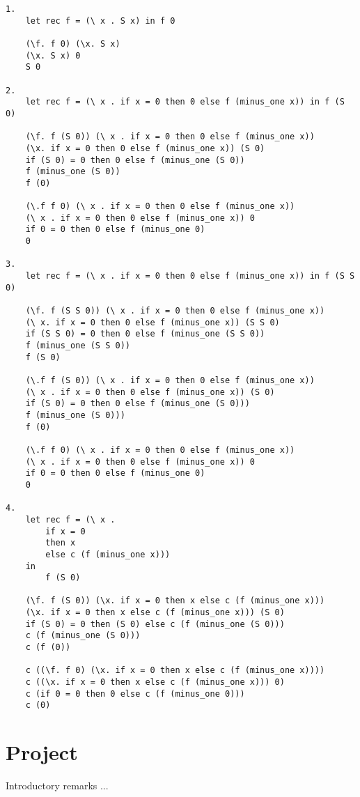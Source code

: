 \documentclass{article}
\theoremstyle{theorem}
\theoremstyle{definition}
\theoremstyle{remark}
\begin{document}
\begin{verbatim}
1.
    let rec f = (\ x . S x) in f 0

    (\f. f 0) (\x. S x)
    (\x. S x) 0
    S 0

2.
    let rec f = (\ x . if x = 0 then 0 else f (minus_one x)) in f (S 0)

    (\f. f (S 0)) (\ x . if x = 0 then 0 else f (minus_one x))
    (\x. if x = 0 then 0 else f (minus_one x)) (S 0)
    if (S 0) = 0 then 0 else f (minus_one (S 0)) 
    f (minus_one (S 0))
    f (0) 

    (\.f f 0) (\ x . if x = 0 then 0 else f (minus_one x))
    (\ x . if x = 0 then 0 else f (minus_one x)) 0
    if 0 = 0 then 0 else f (minus_one 0)
    0

3.
    let rec f = (\ x . if x = 0 then 0 else f (minus_one x)) in f (S S 0)

    (\f. f (S S 0)) (\ x . if x = 0 then 0 else f (minus_one x))
    (\ x. if x = 0 then 0 else f (minus_one x)) (S S 0)
    if (S S 0) = 0 then 0 else f (minus_one (S S 0))
    f (minus_one (S S 0))
    f (S 0)

    (\.f f (S 0)) (\ x . if x = 0 then 0 else f (minus_one x))
    (\ x . if x = 0 then 0 else f (minus_one x)) (S 0)
    if (S 0) = 0 then 0 else f (minus_one (S 0))) 
    f (minus_one (S 0))) 
    f (0)

    (\.f f 0) (\ x . if x = 0 then 0 else f (minus_one x))
    (\ x . if x = 0 then 0 else f (minus_one x)) 0
    if 0 = 0 then 0 else f (minus_one 0)
    0

4.
    let rec f = (\ x . 
        if x = 0 
        then x 
        else c (f (minus_one x))) 
    in 
        f (S 0)

    (\f. f (S 0)) (\x. if x = 0 then x else c (f (minus_one x)))
    (\x. if x = 0 then x else c (f (minus_one x))) (S 0)
    if (S 0) = 0 then (S 0) else c (f (minus_one (S 0)))
    c (f (minus_one (S 0)))
    c (f (0))

    c ((\f. f 0) (\x. if x = 0 then x else c (f (minus_one x))))
    c ((\x. if x = 0 then x else c (f (minus_one x))) 0)
    c (if 0 = 0 then 0 else c (f (minus_one 0)))
    c (0)
\end{verbatim}


\section{Project}

Introductory remarks ...
\end{document}
